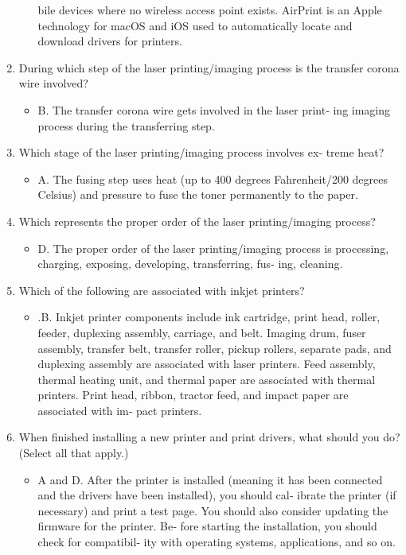 \documentclass{article}
\begin{document}
\begin{enumerate}
\begin{itemize}
bile devices where no wireless access point exists. AirPrint is
an Apple technology for macOS and iOS used to automatically
locate and download drivers for printers.
    \end{itemize}
    \item During which step of the laser printing/imaging process is the
transfer corona wire involved?
    \begin{itemize}
        \item B. The transfer corona wire gets involved in the laser print‐
ing imaging process during the transferring step.
    \end{itemize}
    \item Which stage of the laser printing/imaging process involves ex‐
treme heat?
    \begin{itemize}
        \item A. The fusing step uses heat (up to 400 degrees Fahrenheit/200
degrees Celsius) and pressure to fuse the toner permanently to
the paper.
    \end{itemize}
    \item Which represents the proper order of the laser printing/imaging
process?
    \begin{itemize}
        \item D. The proper order of the laser printing/imaging process is
processing, charging, exposing, developing, transferring, fus‐
ing, cleaning.
    \end{itemize}
    \item Which of the following are associated with inkjet printers?
    \begin{itemize}
        \item .B. Inkjet printer components include ink cartridge, print head,
roller, feeder, duplexing assembly, carriage, and belt. Imaging
drum, fuser assembly, transfer belt, transfer roller, pickup
rollers, separate pads, and duplexing assembly are associated
with laser printers. Feed assembly, thermal heating unit, and
thermal paper are associated with thermal printers. Print head,
ribbon, tractor feed, and impact paper are associated with im‐
pact printers.
    \end{itemize}
    \item When finished installing a new printer and print drivers, what
should you do? (Select all that apply.)
    \begin{itemize}
        \item A and D. After the printer is installed (meaning it has been
connected and the drivers have been installed), you should cal‐
ibrate the printer (if necessary) and print a test page. You
should also consider updating the firmware for the printer. Be‐
fore starting the installation, you should check for compatibil‐
ity with operating systems, applications, and so on.
    \end{itemize}
    
\end{enumerate}
\end{document}
